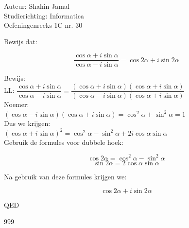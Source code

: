\documentclass[a4paper]{article}
\begin{document}
  
\noindent \large Auteur: Shahin Jamal \\
\noindent \large Studierichting: Informatica\\
\noindent \large Oefeningenreeks 1C nr. 30\\

\medskip

\normalsize

Bewijs dat:

\[
\dfrac{\cos \alpha + i \sin \alpha}{\cos \alpha - i \sin \alpha} = \cos 2\alpha + i \sin 2\alpha
\]

Bewijs:\\

LL: $\dfrac{\cos \alpha + i \sin \alpha}{\cos \alpha - i \sin \alpha} = \dfrac{(\cos \alpha + i \sin \alpha)(\cos \alpha + i \sin \alpha)}{(\cos \alpha - i \sin \alpha)(\cos \alpha + i \sin \alpha)}$\\

Noemer:\\

$(\cos \alpha - i \sin \alpha)(\cos \alpha + i \sin \alpha) = \cos^2 \alpha + \sin^2 \alpha = 1$\\

Dus we krijgen:\\

$(\cos \alpha + i \sin \alpha)^2 = \cos^2 \alpha - \sin^2 \alpha + 2i \cos \alpha \sin \alpha$\\

Gebruik de formules voor dubbele hoek:

\[
\cos 2\alpha = \cos^2 \alpha - \sin^2 \alpha
\]
\[
\sin 2\alpha = 2 \cos \alpha \sin \alpha
\]

Na gebruik van deze formules krijgen we:

\[
\cos 2\alpha + i \sin 2\alpha
\]

QED
\begin{thebibliography}{999}
\end{thebibliography}
\end{document}
